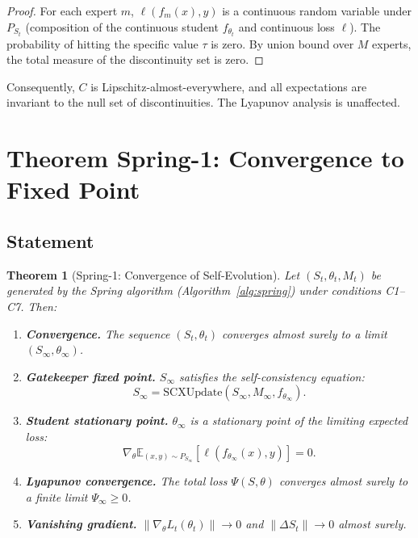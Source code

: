 \documentclass[11pt,a4paper]{article}
\theoremstyle{plain}
\newtheorem{theorem}{Theorem}[section]
\theoremstyle{definition}
\theoremstyle{remark}
\newcommand{\E}{\mathbb{E}}
\begin{document}
\begin{proof}
    For each expert $m$, $\ell(f_m(x), y)$ is a continuous random variable under $P_{S_t}$ (composition of the continuous student $f_{\theta_t}$ and continuous loss $\ell$). The probability of hitting the specific value $\tau$ is zero. By union bound over $M$ experts, the total measure of the discontinuity set is zero.
\end{proof}

Consequently, $C$ is Lipschitz-almost-everywhere, and all expectations are invariant to the null set of discontinuities. The Lyapunov analysis is unaffected.

\section{Theorem Spring-1: Convergence to Fixed Point}

\subsection{Statement}

\begin{theorem}[Spring-1: Convergence of Self-Evolution]\label{thm:spring1}
    Let $(S_t, \theta_t, M_t)$ be generated by the Spring algorithm (Algorithm~\ref{alg:spring}) under conditions C1--C7. Then:
    \begin{enumerate}[label=(\alph*), nosep]
        \item \textbf{Convergence.} The sequence $(S_t, \theta_t)$ converges almost surely to a limit $(S_\infty, \theta_\infty)$.
        \item \textbf{Gatekeeper fixed point.} $S_\infty$ satisfies the self-consistency equation:
        \begin{equation}
            S_\infty = \text{SCXUpdate}(S_\infty, M_\infty, f_{\theta_\infty}).
        \end{equation}
        \item \textbf{Student stationary point.} $\theta_\infty$ is a stationary point of the limiting expected loss:
        \begin{equation}
            \nabla_\theta \E_{(x,y) \sim P_{S_\infty}}[\ell(f_{\theta_\infty}(x), y)] = 0.
        \end{equation}
        \item \textbf{Lyapunov convergence.} The total loss $\Psi(S, \theta)$ converges almost surely to a finite limit $\Psi_\infty \geq 0$.
        \item \textbf{Vanishing gradient.} $\|\nabla_\theta L_t(\theta_t)\| \to 0$ and $\|\Delta S_t\| \to 0$ almost surely.
    \end{enumerate}
\end{theorem}
\end{document}
